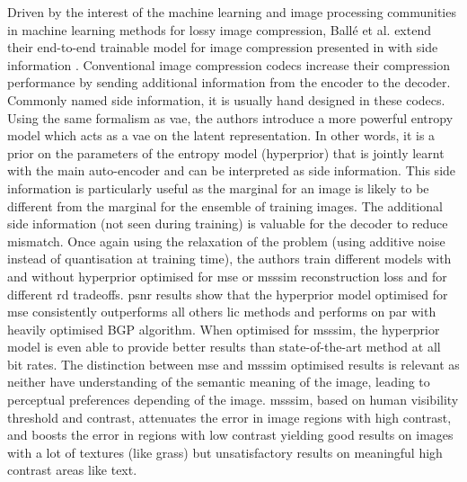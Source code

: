 Driven by the interest of the machine learning and image processing communities in machine learning methods for lossy image compression, Ballé et al. extend their end-to-end trainable model for image compression presented in \cite{ballé2017endtoendoptimizedimagecompression} with side information \cite{ballé2018variationalimagecompressionscale}. Conventional image compression codecs increase their compression performance by sending additional information from the encoder to the decoder. Commonly named side information, it is usually hand designed in these codecs. Using the same formalism as \acrfull{vae}, the authors introduce a more powerful entropy model which acts as a \acrshort{vae} on the latent representation. In other words, it is a prior on the parameters of the entropy model (hyperprior) that is jointly learnt with the main auto-encoder and can be interpreted as side information. This side information is particularly useful as the marginal for an image is likely to be different from the marginal for the ensemble of training images. The additional side information (not seen during training) is valuable for the decoder to reduce mismatch. Once again using the relaxation of the problem (using additive noise instead of quantisation at training time), the authors train different models with and without hyperprior optimised for \acrshort{mse} or \acrshort{msssim} reconstruction loss and for different \acrshort{rd} tradeoffs. \acrshort{psnr} results show that the hyperprior model optimised for \acrshort{mse} consistently outperforms all others \acrshort{lic} methods and performs on par with heavily optimised BGP algorithm. When optimised for \acrshort{msssim}, the hyperprior model is even able to provide better results than state-of-the-art method at all bit rates. The distinction between \acrshort{mse} and \acrshort{msssim} optimised results is relevant as neither have understanding of the semantic meaning of the image, leading to perceptual preferences depending of the image. \acrshort{msssim}, based on human visibility threshold and contrast, attenuates the error in image regions with high contrast, and boosts the error in regions with low contrast yielding good results on images with a lot of textures (like grass) but unsatisfactory results on meaningful high contrast areas like text.

